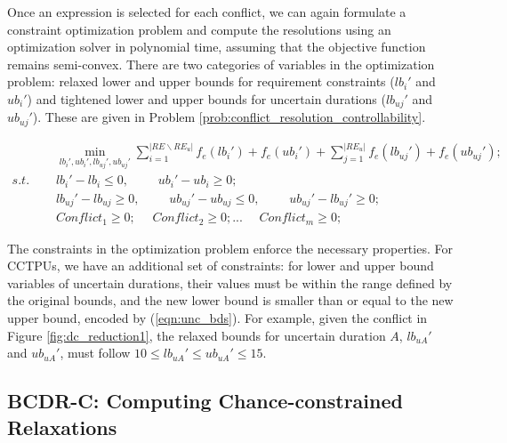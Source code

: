\documentclass[jair,twoside,11pt,theapa]{article}
\begin{document}
Once an expression is selected for each conflict, we can again formulate a
constraint optimization problem and compute the resolutions using an
optimization solver in polynomial time, assuming that the objective function
remains semi-convex. There are two categories of variables in the optimization
problem: relaxed lower and upper bounds for requirement constraints ($lb_i'$ and
$ub_i'$) and tightened lower and upper bounds for uncertain durations
($lb_{uj}'$ and $ub_{uj}'$). These are given in Problem \ref{prob:conflict_resolution_controllability}.

\begin{problem}
	\begin{align}
		&\phantom{=}	\min_{lb_i',ub_i',lb_{uj}',ub_{uj}'}\sum\limits_{i=1}^{|RE\backslash RE_u|}f_{e}(lb_i')+f_{e}(ub_i')+\sum\limits_{j=1}^{|RE_u|}f_{e}(lb_{uj}')+f_{e}(ub_{uj}');\\
		s.t. &\phantom{=} lb_i'-lb_i \leq 0, \quad \phantom{=} ub_i'-ub_i \geq 0; \\
			&\phantom{=} lb_{uj}'-lb_{uj} \geq 0, \quad \phantom{=} ub_{uj}'-ub_{uj} \leq 0, \quad \phantom{=} ub_{uj}'-lb_{uj}' \geq 0; \label{eqn:unc_bds}\\
			&\phantom{=} Conflict_1 \geq 0; \phantom{=} Conflict_2 \geq 0;  ... \phantom{=} Conflict_m \geq 0;
	\end{align}
	\label{prob:conflict_resolution_controllability}
\end{problem}
	

The constraints in the optimization problem enforce the necessary properties.
For CCTPUs, we have an additional set of constraints: for lower and upper bound
variables of uncertain durations, their values must be within the range defined
by the original bounds, and the new lower bound is smaller than or equal to the new upper
bound, encoded by (\ref{eqn:unc_bds}). For example, given the conflict in Figure
\ref{fig:dc_reduction1}, the relaxed bounds for uncertain duration $A$, $lb_{uA}'$
and $ub_{uA}'$, must follow $10 \leq lb_{uA}' \leq ub_{uA}' \leq 15$.


\subsection{BCDR-C: Computing Chance-constrained Relaxations}
\end{document}
